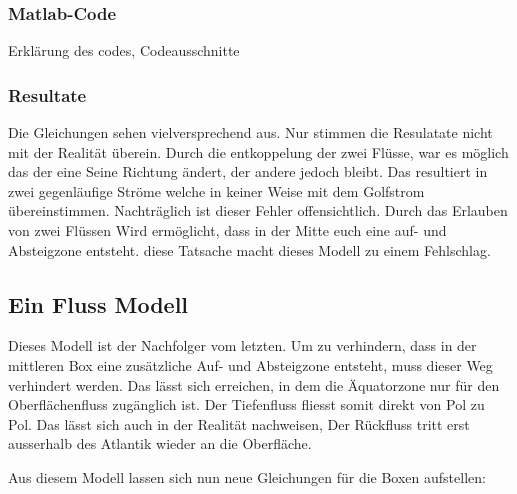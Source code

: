 \subsubsection{Matlab-Code}

Erklärung des codes, Codeausschnitte

\subsubsection{Resultate}


Die Gleichungen sehen vielversprechend aus. Nur stimmen die Resulatate nicht mit der Realität überein.
Durch die entkoppelung der zwei Flüsse, war es möglich das der eine Seine Richtung ändert, der andere jedoch bleibt. Das resultiert in zwei gegenläufige Ströme welche in keiner Weise mit dem Golfstrom übereinstimmen.
Nachträglich ist dieser Fehler offensichtlich. Durch das Erlauben von zwei Flüssen Wird ermöglicht, dass in der Mitte euch eine auf- und Absteigzone entsteht.
diese Tatsache macht dieses Modell zu einem Fehlschlag.


\subsection{Ein Fluss Modell} 

Dieses Modell ist der Nachfolger vom letzten. 
Um zu verhindern, dass in der mittleren Box eine zusätzliche Auf- und Absteigzone entsteht, muss dieser Weg verhindert werden. Das lässt sich erreichen, in dem die Äquatorzone nur für den Oberflächenfluss zugänglich ist. Der Tiefenfluss fliesst somit direkt von Pol zu Pol. 
Das lässt sich auch in der Realität nachweisen, Der Rückfluss tritt erst ausserhalb des Atlantik wieder an die Oberfläche.


Aus diesem Modell lassen sich nun neue Gleichungen für die Boxen aufstellen:

